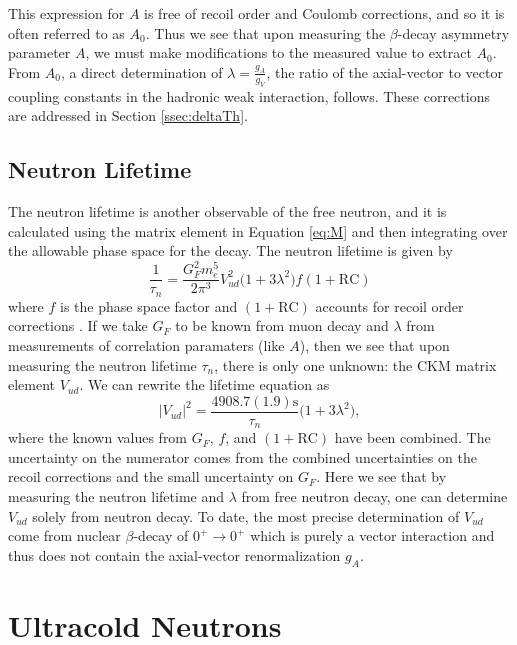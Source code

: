 This expression for $A$ is free of recoil order and Coulomb corrections, and so it is
often referred to as $A_0$. Thus we see that upon measuring the $\beta$-decay
asymmetry parameter $A$, we must make modifications to the measured value to extract
$A_0$. From $A_0$, a direct determination of $\lambda = \frac{g_A}{g_V}$, the ratio of the axial-vector to vector
coupling constants in the hadronic weak interaction, follows.
These corrections are addressed in Section \ref{ssec:deltaTh}.

\subsection{Neutron Lifetime}
The neutron lifetime is another observable of the free neutron, and it is calculated using the matrix
element in Equation \ref{eq:M} and then integrating over the allowable phase space for the decay.
The neutron lifetime is given by
%
\begin{equation}
  \frac{1}{\tau_n} = \frac{G_F^2 m_e^5}{2\pi^3}V_{ud}^2 \big(1+3\lambda^2)f(1+\mathrm{RC})
\end{equation}
%
where $f$ is the phase space factor and $(1+\mathrm{RC})$ accounts for recoil order
corrections \cite{czarnecki2004precision}. If we take $G_F$ to be known from muon decay and $\lambda$ from
measurements of correlation paramaters (like $A$), then we see that upon measuring the
neutron lifetime $\tau_n$, there is only one unknown: the CKM matrix element $V_{ud}$.
We can rewrite the lifetime equation as
%
\begin{equation}
  |V_{ud}|^2 = \frac{4908.7(1.9)\mathrm{s}}{\tau_n}\big(1+3\lambda^2\big),
\end{equation}
where the known values from $G_F$, $f$, and $(1+\mathrm{RC})$ have been combined.
The uncertainty on the numerator comes from the combined uncertainties on
the recoil corrections and the small uncertainty on $G_F$. Here we see that
by measuring the neutron lifetime and $\lambda$ from free neutron decay,
one can determine $V_{ud}$ solely from neutron decay. 
To date, the most precise determination of $V_{ud}$ come from nuclear
$\beta$-decay of $0^+ \rightarrow 0^+$ which is purely a vector interaction
and thus does not contain the axial-vector renormalization $g_A$.



\section{Ultracold Neutrons}

